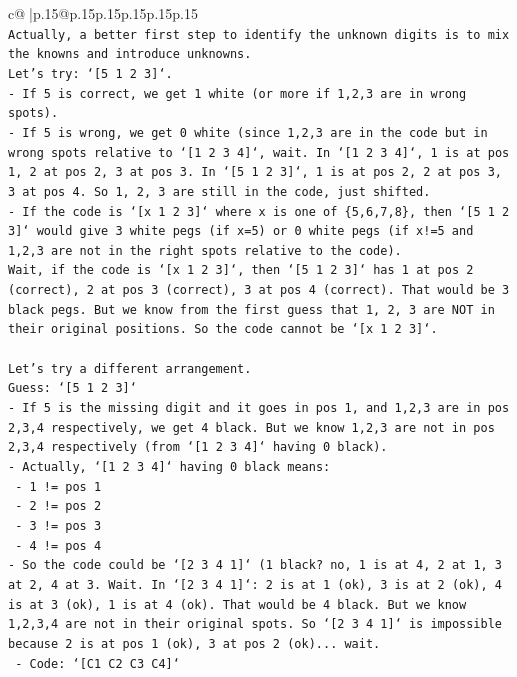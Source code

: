 \documentclass{article}
\begin{document}
{\begin{supertabular}{c@{$\;$}|p{.15\linewidth}@{}p{.15\linewidth}p{.15\linewidth}p{.15\linewidth}p{.15\linewidth}p{.15\linewidth}}
{{{\\ 
\texttt{Actually, a better first step to identify the unknown digits is to mix the knowns and introduce unknowns.} \\
\texttt{Let's try: `{[}5 1 2 3{]}`.} \\
\texttt{{-} If 5 is correct, we get 1 white (or more if 1,2,3 are in wrong spots).} \\
\texttt{{-} If 5 is wrong, we get 0 white (since 1,2,3 are in the code but in wrong spots relative to `{[}1 2 3 4{]}`, wait. In `{[}1 2 3 4{]}`, 1 is at pos 1, 2 at pos 2, 3 at pos 3. In `{[}5 1 2 3{]}`, 1 is at pos 2, 2 at pos 3, 3 at pos 4. So 1, 2, 3 are still in the code, just shifted.} \\
\texttt{{-} If the code is `{[}x 1 2 3{]}` where x is one of \{5,6,7,8\}, then `{[}5 1 2 3{]}` would give 3 white pegs (if x=5) or 0 white pegs (if x!=5 and 1,2,3 are not in the right spots relative to the code).} \\
\texttt{Wait, if the code is `{[}x 1 2 3{]}`, then `{[}5 1 2 3{]}` has 1 at pos 2 (correct), 2 at pos 3 (correct), 3 at pos 4 (correct). That would be 3 black pegs. But we know from the first guess that 1, 2, 3 are NOT in their original positions. So the code cannot be `{[}x 1 2 3{]}`.} \\
\\ 
\texttt{Let's try a different arrangement.} \\
\texttt{Guess: `{[}5 1 2 3{]}`} \\
\texttt{{-} If 5 is the missing digit and it goes in pos 1, and 1,2,3 are in pos 2,3,4 respectively, we get 4 black. But we know 1,2,3 are not in pos 2,3,4 respectively (from `{[}1 2 3 4{]}` having 0 black).} \\
\texttt{{-} Actually, `{[}1 2 3 4{]}` having 0 black means:} \\
\texttt{  {-} 1 != pos 1} \\
\texttt{  {-} 2 != pos 2} \\
\texttt{  {-} 3 != pos 3} \\
\texttt{  {-} 4 != pos 4} \\
\texttt{{-} So the code could be `{[}2 3 4 1{]}` (1 black? no, 1 is at 4, 2 at 1, 3 at 2, 4 at 3. Wait. In `{[}2 3 4 1{]}`: 2 is at 1 (ok), 3 is at 2 (ok), 4 is at 3 (ok), 1 is at 4 (ok). That would be 4 black. But we know 1,2,3,4 are not in their original spots. So `{[}2 3 4 1{]}` is impossible because 2 is at pos 1 (ok), 3 at pos 2 (ok)... wait.} \\
\texttt{  {-} Code: `{[}C1 C2 C3 C4{]}`} \\
}}}
\end{supertabular}}
\end{document}
